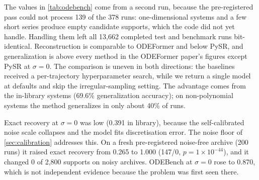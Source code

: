 \begin{table}[t]
\centering
\caption{ODEBench, primary set (63 systems $\times$ 6 noise levels = 378 runs; means over $\sigma=0$--5\%). Baseline ranges are read off the ODEFormer paper's figures ($\pm3$ points, ranging from $\sigma=5\%$ to $0$) and are not like-for-like (see text). Our row is the second run described in the text.}
\label{tab:odebench}
\small
{}
\end{table}

The values in \cref{tab:odebench} come from a second run, because the pre-registered pass could not process 139 of the 378 runs: one-dimensional systems and a few short series produce empty candidate supports, which the code did not yet handle. Handling them left all 13{,}662 completed test and benchmark runs bit-identical. Reconstruction is comparable to ODEFormer and below PySR, and generalization is above every method in the ODEFormer paper's figures except PySR at $\sigma=0$. The comparison is uneven in both directions: the baselines received a per-trajectory hyperparameter search, while we return a single model at defaults and skip the irregular-sampling setting. The advantage comes from the in-library systems (69.6\% generalization accuracy); on non-polynomial systems the method generalizes in only about 40\% of runs.

Exact recovery at $\sigma=0$ was low (0.391 in library), because the self-calibrated noise scale collapses and the model fits discretisation error. The noise floor of \cref{sec:calibration} addresses this. On a fresh pre-registered noise-free archive (200 runs) it raised exact recovery from 0.265 to 1.000 (147/0, $p=1\times10^{-44}$), and it changed 0 of 2{,}800 supports on noisy archives. ODEBench at $\sigma=0$ rose to 0.870, which is not independent evidence because the problem was first seen there.

